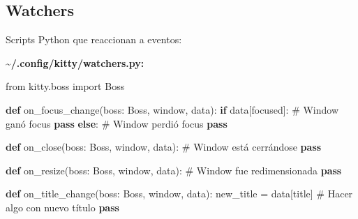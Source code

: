 \documentclass[
  doc,
  floatsintext,
  longtable,
  a4paper,
  nolmodern,
  notxfonts,
  notimes,
  12pt,
  colorlinks=true,linkcolor=blue,citecolor=blue,urlcolor=blue]{apa7}
\newenvironment{Shaded}{\begin{snugshade}}{\end{snugshade}}
\newcommand{\CommentTok}[1]{\textcolor[rgb]{0.37,0.37,0.37}{#1}}
\newcommand{\ControlFlowTok}[1]{\textcolor[rgb]{0.00,0.23,0.31}{\textbf{#1}}}
\newcommand{\DataTypeTok}[1]{\textcolor[rgb]{0.68,0.00,0.00}{#1}}
\newcommand{\ErrorTok}[1]{\textcolor[rgb]{0.68,0.00,0.00}{#1}}
\newcommand{\ImportTok}[1]{\textcolor[rgb]{0.00,0.46,0.62}{#1}}
\newcommand{\KeywordTok}[1]{\textcolor[rgb]{0.00,0.23,0.31}{\textbf{#1}}}
\newcommand{\NormalTok}[1]{\textcolor[rgb]{0.00,0.23,0.31}{#1}}
\newcommand{\OperatorTok}[1]{\textcolor[rgb]{0.37,0.37,0.37}{#1}}
\newcommand{\StringTok}[1]{\textcolor[rgb]{0.13,0.47,0.30}{#1}}
\begin{document}
\begin{Shaded}
\end{Shaded}

\subsection{Watchers}\label{watchers}

Scripts Python que reaccionan a eventos:

\textbf{\textasciitilde/.config/kitty/watchers.py:}

\begin{Shaded}
\begin{Highlighting}[]
\ImportTok{from}\NormalTok{ kitty.boss }\ImportTok{import}\NormalTok{ Boss}

\KeywordTok{def}\NormalTok{ on\_focus\_change(boss: Boss, window, data):}
    \ControlFlowTok{if}\NormalTok{ data[}\StringTok{\textquotesingle{}focused\textquotesingle{}}\NormalTok{]:}
        \CommentTok{\# Window ganó focus}
        \ControlFlowTok{pass}
    \ControlFlowTok{else}\NormalTok{:}
        \CommentTok{\# Window perdió focus}
        \ControlFlowTok{pass}

\KeywordTok{def}\NormalTok{ on\_close(boss: Boss, window, data):}
    \CommentTok{\# Window está cerrándose}
    \ControlFlowTok{pass}

\KeywordTok{def}\NormalTok{ on\_resize(boss: Boss, window, data):}
    \CommentTok{\# Window fue redimensionada}
    \ControlFlowTok{pass}

\KeywordTok{def}\NormalTok{ on\_title\_change(boss: Boss, window, data):}
\NormalTok{    new\_title }\OperatorTok{=}\NormalTok{ data[}\StringTok{\textquotesingle{}title\textquotesingle{}}\NormalTok{]}
    \CommentTok{\# Hacer algo con nuevo título}
    \ControlFlowTok{pass}
\end{Highlighting}
\end{Shaded}
\end{document}
